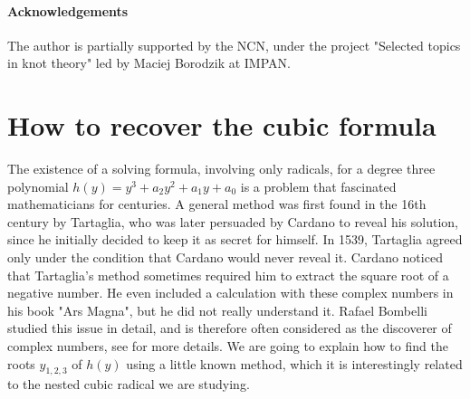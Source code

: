 \documentclass[11pt,a4paper]{article}
\numberwithin{equation}{section}
\theoremstyle{definition}
\begin{document}
\paragraph*{Acknowledgements}
The author is partially supported by the NCN, under the project "Selected topics in knot theory" led by Maciej Borodzik at IMPAN.

\section{How to recover the cubic formula}
\label{section:two}
The existence of a solving formula, involving only radicals, for a degree three polynomial $h(y)=y^3+a_2y^2+a_1y+a_0$ is a problem that fascinated mathematicians for centuries. 
A general method was first found in the 16th century by Tartaglia, who was later persuaded by Cardano to reveal his solution, since he initially decided to keep it as secret for himself. In 1539, Tartaglia agreed only under the condition that Cardano would never reveal it. 
Cardano noticed that Tartaglia's method sometimes required him to extract the square root of a negative number. He even included a calculation with these complex numbers in his book "Ars Magna", but he did not really understand it. Rafael Bombelli studied this issue in detail, and is therefore often considered as the discoverer of complex numbers, see \cite{Guilbeau,lNM} for more details. 
We are going to explain how to find the roots $y_{1,2,3}$ of $h(y)$ using a little known method, which it is interestingly related to the nested cubic radical we are studying.
\end{document}

